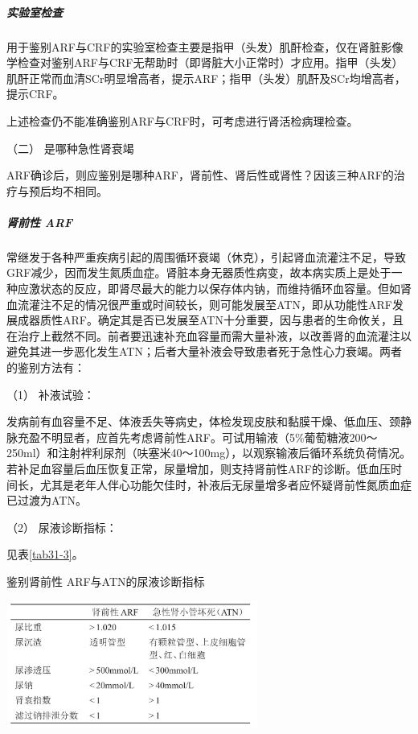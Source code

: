 \subparagraph{实验室检查}

用于鉴别ARF与CRF的实验室检查主要是指甲（头发）肌酐检查，仅在肾脏影像学检查对鉴别ARF与CRF无帮助时（即肾脏大小正常时）才应用。指甲（头发）肌酐正常而血清SCr明显增高者，提示ARF；指甲（头发）肌酐及SCr均增高者，提示CRF。

上述检查仍不能准确鉴别ARF与CRF时，可考虑进行肾活检病理检查。

\hypertarget{text00083.htmlux5cux23CHP3-7-5-5-2}{}
（二） 是哪种急性肾衰竭

ARF确诊后，则应鉴别是哪种ARF，肾前性、肾后性或肾性？因该三种ARF的治疗与预后均不相同。

\subparagraph{肾前性 ARF}

常继发于各种严重疾病引起的周围循环衰竭（休克），引起肾血流灌注不足，导致GRF减少，因而发生氮质血症。肾脏本身无器质性病变，故本病实质上是处于一种应激状态的反应，即肾尽最大的能力以保存体内钠，而维持循环血容量。但如肾血流灌注不足的情况很严重或时间较长，则可能发展至ATN，即从功能性ARF发展成器质性ARF。确定其是否已发展至ATN十分重要，因与患者的生命攸关，且在治疗上截然不同。前者要迅速补充血容量而需大量补液，以改善肾的血流灌注以避免其进一步恶化发生ATN；后者大量补液会导致患者死于急性心力衰竭。两者的鉴别方法有：

\hypertarget{text00083.htmlux5cux23CHP3-7-5-5-2-1-1}{}
（1） 补液试验：

发病前有血容量不足、体液丢失等病史，体检发现皮肤和黏膜干燥、低血压、颈静脉充盈不明显者，应首先考虑肾前性ARF。可试用输液（5\%葡萄糖液200～250ml）和注射袢利尿剂（呋塞米40～100mg），以观察输液后循环系统负荷情况。若补足血容量后血压恢复正常，尿量增加，则支持肾前性ARF的诊断。低血压时间长，尤其是老年人伴心功能欠佳时，补液后无尿量增多者应怀疑肾前性氮质血症已过渡为ATN。

\hypertarget{text00083.htmlux5cux23CHP3-7-5-5-2-1-2}{}
（2） 尿液诊断指标：

见表\ref{tab31-3}。

\begin{table}[htbp]
\centering
\caption{鉴别肾前性 ARF与ATN的尿液诊断指标}
\label{tab31-3}
\includegraphics[width=3.26042in,height=1.63542in]{./images/Image00120.jpg}
\end{table}


